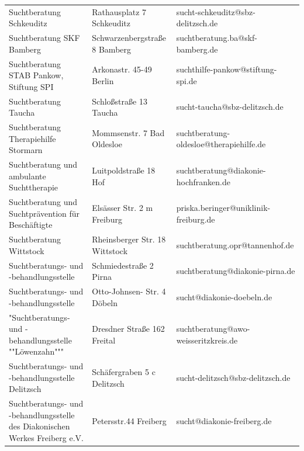 {\begin{xltabular}{\textwidth} {
 >{\raggedright\arraybackslash}p{5cm}
 >{\raggedright\arraybackslash}X
 >{\raggedright\arraybackslash}p{5cm} }
Suchtberatung Schkeuditz & Rathausplatz 7 Schkeuditz & sucht-schkeuditz@sbz-delitzsch.de \\
Suchtberatung SKF Bamberg & Schwarzenbergstraße 8 Bamberg & suchtberatung.ba@skf-bamberg.de \\
Suchtberatung STAB Pankow, Stiftung SPI & Arkonastr. 45-49 Berlin & suchthilfe-pankow@stiftung-spi.de \\
Suchtberatung Taucha & Schloßstraße 13 Taucha & sucht-taucha@sbz-delitzsch.de \\
Suchtberatung Therapiehilfe Stormarn & Mommsenstr. 7 Bad Oldesloe & suchtberatung-oldesloe@therapiehilfe.de \\
Suchtberatung und ambulante Suchttherapie & Luitpoldstraße 18 Hof & suchtberatung@diakonie-hochfranken.de \\
Suchtberatung und Suchtprävention für Beschäftigte & Elsässer Str. 2 m Freiburg & priska.beringer@uniklinik-freiburg.de \\
Suchtberatung Wittstock & Rheinsberger Str. 18 Wittstock & suchtberatung.opr@tannenhof.de \\
Suchtberatungs- und -behandlungsstelle & Schmiedestraße 2 Pirna & suchtberatung@diakonie-pirna.de \\
Suchtberatungs- und -behandlungsstelle & Otto-Johnsen- Str. 4 Döbeln & sucht@diakonie-doebeln.de \\
"Suchtberatungs- und -behandlungsstelle ""Löwenzahn""" & Dresdner Straße 162 Freital & suchtberatung@awo-weisseritzkreis.de \\
Suchtberatungs- und -behandlungsstelle Delitzsch & Schäfergraben 5 c Delitzsch & sucht-delitzsch@sbz-delitzsch.de \\
Suchtberatungs- und -behandlungsstelle des Diakonischen Werkes Freiberg e.V. & Petersstr.44 Freiberg & sucht@diakonie-freiberg.de \\

\end{xltabular}}
